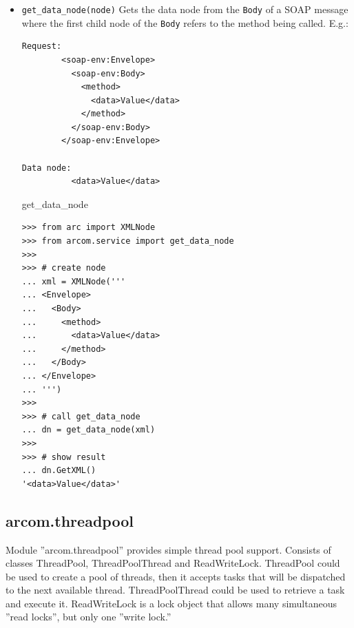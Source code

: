 \documentclass{article}
\begin{document}
\begin{flushleft}
\begin{itemize}
  \item{ \verb$get_data_node(node)$ \linebreak
  Gets the data node from the \verb$Body$ of a SOAP message where the first child node 
  of the \verb$Body$ refers to the method being called. E.g.:
\begin{verbatim}
Request:
        <soap-env:Envelope>
          <soap-env:Body>
            <method>
              <data>Value</data>
            </method>
          </soap-env:Body>
        </soap-env:Envelope>

Data node:
          <data>Value</data>
\end{verbatim}
    \begin{example}
      \caption{get\_data\_node}\label{gdnex}
\begin{verbatim}
>>> from arc import XMLNode
>>> from arcom.service import get_data_node
>>> 
>>> # create node
... xml = XMLNode('''
... <Envelope>
...   <Body>
...     <method>
...       <data>Value</data>
...     </method>
...   </Body>
... </Envelope>
... ''')
>>> 
>>> # call get_data_node
... dn = get_data_node(xml)
>>> 
>>> # show result
... dn.GetXML()
'<data>Value</data>'
\end{verbatim}
    \end{example}
  }
\end{itemize}

\end{flushleft}

\subsection{arcom.threadpool}
\label{athreadpool}
Module ''arcom.threadpool'' provides simple thread pool support.
Consists of classes ThreadPool, ThreadPoolThread and ReadWriteLock.
ThreadPool could be used to create a pool of threads, then it accepts 
tasks that will be dispatched to the next available thread.
ThreadPoolThread could be used to retrieve a task and execute it.
ReadWriteLock is a lock object that allows many simultaneous ''read locks'', 
but only one ''write lock.''
\end{document}
